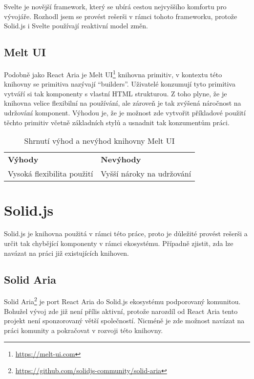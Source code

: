 Svelte je novější framework, který se ubírá cestou nejvyššího komfortu pro vývojáře.
Rozhodl jsem se provést rešerši v rámci tohoto frameworku, protože Solid.js i Svelte používají reaktivní model změn.

\subsection{Melt UI}

Podobně jako React Aria je Melt UI\footnote{\url{https://melt-ui.com}} knihovna primitiv, v kontextu této knihovny se primitiva nazývají ``builders''.
Uživatelé konzumují tyto primitiva vytváří si tak komponenty s vlastní HTML strukturou.
Z toho plyne, že je knihovna velice flexibilní na používání, ale zároveň je tak zvýšená náročnost na udržování komponent.
Výhodou je, že je možnost zde vytvořit příkladové použití těchto primitiv včetně základních stylů a usnadnit tak konzumentům práci.

\begin{table}[ht]
    \begin{ctucolortab}
        \begin{tabularx}{\textwidth}{Y Y}
            \bfseries \textcolor{OK}{Výhody} & \bfseries \textcolor{NOT_OK}{Nevýhody} \\\Midrule{}
            Vysoká flexibilita použití       & Vyšší nároky na udržování
        \end{tabularx}
    \end{ctucolortab}
    \caption{Shrnutí výhod a nevýhod knihovny Melt UI}
\end{table}

\section{Solid.js}

Solid.js je knihovna použitá v rámci této práce, proto je důležité provést rešerši a určit tak chybějící komponenty v rámci ekosystému.
Případně zjistit, zda lze navázat na práci již existujících knihoven.

\subsection{Solid Aria}

Solid Aria\footnote{\url{https://github.com/solidjs-community/solid-aria}} je port React Aria do Solid.js ekosystému podporovaný komunitou.
Bohužel vývoj zde již není přílis aktivní, protože narozdíl od React Aria tento projekt není sponzorovaný větší společností.
Nicméně je zde možnost navázat na práci komunity a pokračovat v rozvoji této knihovny.

